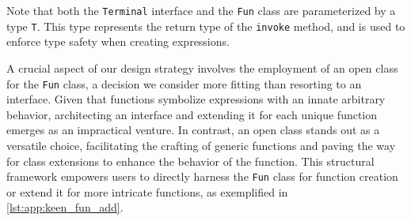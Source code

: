   Note that both the \texttt{Terminal} interface and the \texttt{Fun} class
  are parameterized by a type \texttt{T}. This type represents the return
  type of the \texttt{invoke} method, and is used to enforce type safety
  when creating expressions.

  A crucial aspect of our design strategy involves the employment of an open 
  class for the \texttt{Fun} class, a decision we consider more fitting than 
  resorting to an interface. Given that functions symbolize expressions with 
  an innate arbitrary behavior, architecting an interface and extending it 
  for each unique function emerges as an impractical venture. In contrast, an 
  open class stands out as a versatile choice, facilitating the crafting of 
  generic functions and paving the way for class extensions to enhance the 
  behavior of the function. This structural framework empowers users to 
  directly harness the \texttt{Fun} class for function creation or extend it 
  for more intricate functions, as exemplified in \vref{lst:app:keen_fun_add}.